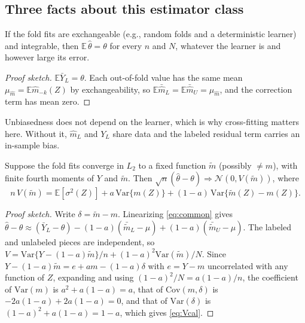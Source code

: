 \subsection{Three facts about this estimator class}

\begin{proposition}
\label{prop:unbiased}
If the fold fits are exchangeable (e.g., random folds and a deterministic learner) and integrable, then $\mathbb E\,\hat\theta=\theta$ for every $n$ and $N$, whatever the learner is and however large its error.
\end{proposition}
\begin{proof}[Proof sketch]
$\mathbb E\bar Y_L=\theta$. Each out-of-fold value has the same mean $\mu_{\hat m}=\mathbb E\hat m_{-k}(Z)$ by exchangeability, so $\mathbb E\bar{\hat m}_L=\mathbb E\bar{\hat m}_U=\mu_{\hat m}$, and the correction term has mean zero.
\end{proof}

Unbiasedness does not depend on the learner, which is why cross-fitting matters here. Without it, $\hat m_L$ and $Y_L$ share data and the labeled residual term carries an in-sample bias.

\begin{proposition}
\label{prop:var}
Suppose the fold fits converge in $L_2$ to a fixed function $\tilde m$ (possibly $\neq m$), with finite fourth moments of $Y$ and $\tilde m$. Then $\sqrt n(\hat\theta-\theta)\Rightarrow\mathcal N(0,V(\tilde m))$, where
\begin{equation}
n\,V(\tilde m)=\mathbb E[\sigma^2(Z)]+a\,\mathrm{Var}\{m(Z)\}+(1-a)\,\mathrm{Var}\{\tilde m(Z)-m(Z)\}.
\label{eq:Vcal}
\end{equation}
\end{proposition}
\begin{proof}[Proof sketch]
Write $\delta=\tilde m-m$. Linearizing \eqref{eq:common} gives $\hat\theta-\theta\approx(\bar Y_L-\theta)-(1-a)(\bar{\tilde m}_L-\mu)+(1-a)(\bar{\tilde m}_U-\mu)$. The labeled and unlabeled pieces are independent, so $V=\mathrm{Var}\{Y-(1-a)\tilde m\}/n+(1-a)^2\mathrm{Var}(\tilde m)/N$. Since $Y-(1-a)\tilde m=e+am-(1-a)\delta$ with $e=Y-m$ uncorrelated with any function of $Z$, expanding and using $(1-a)^2/N=a(1-a)/n$, the coefficient of $\mathrm{Var}(m)$ is $a^2+a(1-a)=a$, that of $\mathrm{Cov}(m,\delta)$ is $-2a(1-a)+2a(1-a)=0$, and that of $\mathrm{Var}(\delta)$ is $(1-a)^2+a(1-a)=1-a$, which gives \eqref{eq:Vcal}.
\end{proof}

